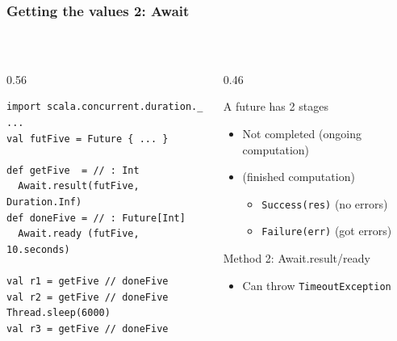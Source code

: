 \documentclass[aspectratio=169]{beamer}
\begin{document}
\begin{frame}[fragile]\frametitle{Getting the values 2: Await}
~\\[-8mm]
\begin{columns}
\begin{column}{0.56\textwidth}
~\\
\begin{lstlisting}[emph={execute,sleep,log,Future,Try,Success,Failure,onComplete,Await,result,ready}]
import scala.concurrent.duration._
...
val futFive = Future { ... }

def getFive  = // : Int
  Await.result(futFive, Duration.Inf) 
def doneFive = // : Future[Int]
  Await.ready (futFive, 10.seconds)

val r1 = getFive // doneFive
val r2 = getFive // doneFive
Thread.sleep(6000)
val r3 = getFive // doneFive
\end{lstlisting}
\end{column}
\begin{column}{0.46\textwidth}
\begin{block}{A future has 2 stages}
\begin{itemize}
  \item \alert{Not completed} (ongoing computation)
  \item {} (finished computation)
  \begin{itemize}
    \item \texttt{Success(res)} (no errors)
    \item \texttt{Failure(err)} (got errors)
  \end{itemize}
\end{itemize}
\end{block}
\begin{alertblock}{Method 2: Await.result/ready}
  \begin{itemize}
    \item Can throw \texttt{TimeoutException}
  \end{itemize}
\end{alertblock}

\end{column}
\end{columns}
\end{frame}
\end{document}
